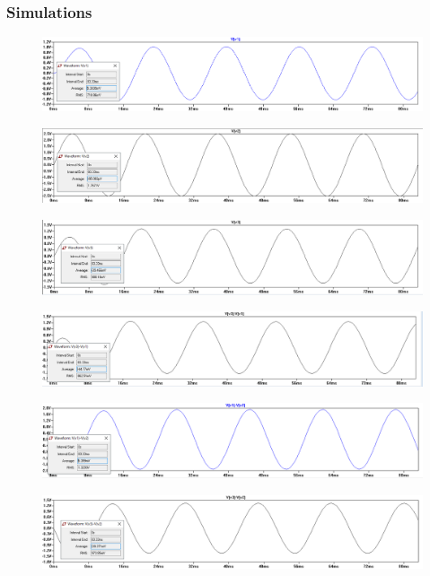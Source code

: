 \documentclass[letterpaper]{article}
\begin{document}
\subsubsection{Simulations}
\begin{figure}[H]
    \centering
    \includegraphics[width=\linewidth]{nod-v1}
\end{figure}
\begin{figure}[H]
    \centering
    \includegraphics[width=\linewidth]{nod-v2}
\end{figure}
\begin{figure}[H]
    \centering
    \includegraphics[width=\linewidth]{nod-v3}
\end{figure}
\begin{figure}[H]
    \centering
    \includegraphics[width=\linewidth]{nod-v13}
\end{figure}
\begin{figure}[H]
    \centering
    \includegraphics[width=\linewidth]{nod-v21}
\end{figure}
\begin{figure}[H]
    \centering
    \includegraphics[width=\linewidth]{nod-v23}
\end{figure}
\end{document}
